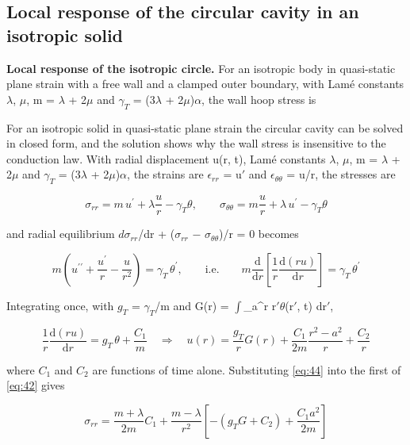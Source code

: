 \documentclass[preprint,12pt]{elsarticle}
\begin{document}
\subsection{Local response of the circular cavity in an isotropic solid}
\label{sec:3.3}

\textbf{Local response of the isotropic circle.} For an isotropic body in quasi-static plane strain with a free wall and a clamped outer boundary, with Lam\'e constants $\lambda$, $\mu$, m = $\lambda$ + 2$\mu$ and $\gamma_{T}$ = (3$\lambda$ + 2$\mu$)$\alpha$, the wall hoop stress is

For an isotropic solid in quasi-static plane strain the circular cavity can be solved in closed form, and the solution shows why the wall stress is insensitive to the conduction law. With radial displacement u(r, t), Lam\'e constants $\lambda$, $\mu$, m = $\lambda$ + 2$\mu$ and $\gamma_{T}$ = (3$\lambda$ + 2$\mu$)$\alpha$, the strains are $\epsilon_{rr}$ = u$'$ and $\epsilon_{\theta\theta}$ = u/r, the stresses are

\begin{equation}
\sigma_{rr}=m\,u^{\prime}+\lambda\frac{u}{r}-\gamma_T\theta,\qquad \sigma_{\theta\theta}=m\frac{u}{r}+\lambda\,u^{\prime}-\gamma_T\theta 
\label{eq:42}
\end{equation}

and radial equilibrium $d\sigma_{rr}$/dr + ($\sigma_{rr}$ $-$ $\sigma_{\theta\theta}$)/r = 0 becomes

\begin{equation}
m\left(u^{\prime\prime}+\frac{u^{\prime}}{r}-\frac{u}{r^2}\right)=\gamma_T\,\theta^{\prime},\qquad \text{i.e.}\qquad m\frac{\mathrm{d}}{\mathrm{d}r}\left[\frac{1}{r}\frac{\mathrm{d}(ru)}{\mathrm{d}r}\right]=\gamma_T\,\theta^{\prime} 
\label{eq:43}
\end{equation}

Integrating once, with $g_{T}$ = $\gamma_{T}$/m and G(r) = $\int$\_{a}^{r} r$'\theta$(r$'$, t) dr$'$,

\begin{equation}
\frac{1}{r}\frac{\mathrm{d}(ru)}{\mathrm{d}r}=g_T\,\theta+\frac{C_1}{m}\quad\Longrightarrow\quad u(r)=\frac{g_T}{r}G(r)+\frac{C_1}{2m}\frac{r^2-a^2}{r}+\frac{C_2}{r} 
\label{eq:44}
\end{equation}

where $C_{1}$ and $C_{2}$ are functions of time alone. Substituting \eqref{eq:44} into the first of \eqref{eq:42} gives

\begin{equation}
\sigma_{rr}=\frac{m+\lambda}{2m}C_1+\frac{m-\lambda}{r^2}\left[-\left(g_T G+C_2\right)+\frac{C_1a^2}{2m}\right] 
\label{eq:45}
\end{equation}
\end{document}

